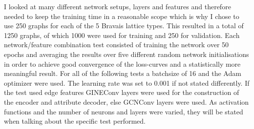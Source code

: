 \documentclass[11pt,a4paper]{article}
\begin{document}
I looked at many different network setups, layers and features and therefore needed to keep the training time in a reasonable scope which is why I chose to use 250 graphs for each of the 5 Bravais lattice types. 
This resulted in a total of 1250 graphs, of which 1000 were used for training and 250 for validation. 
Each network/feature combination test consisted of training the network over 50 epochs and averaging the results over five different random network initialisations in order to achieve good convergence of the loss-curves and a statistically more meaningful result. 
For all of the following tests a batchsize of 16 and the Adam optimizer were used. 
The learning rate was set to 0.001 if not stated differently. 
If the test used edge features GINEConv layers \cite{pygteamGINEConv2024} were used for the construction of the encoder and attribute decoder, else GCNConv layers \cite{pygteamGCNConv2025} were used.
As activation functions and the number of neurons and layers were varied, they will be stated when talking about the specific test performed. \\
\end{document}
